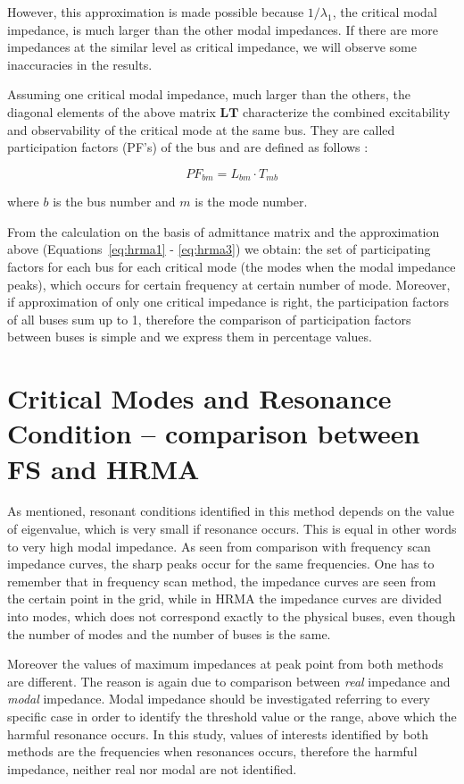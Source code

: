 \documentclass[12pt]{report} %
\begin{document}
However, this approximation is made possible because $1/\lambda_1$, the critical modal impedance, is much larger than the other modal impedances. If there are more impedances at the similar level as critical impedance, we will observe some inaccuracies in the results.

Assuming one critical modal impedance, much larger than the others, the diagonal elements of the above matrix $\bm{LT}$ characterize the combined excitability and observability of the critical mode at the same bus. They are called participation factors (PF's) of the bus and are defined as follows \cite{xu2005}:

\begin{equation} \label{eq:hrma3}
	PF_{bm}=L_{bm}\cdot T_{mb}
\end{equation}

where $b$ is the bus number and $m$ is the mode number.

From the calculation on the basis of admittance matrix and the  approximation above (Equations~\ref{eq:hrma1} - \ref{eq:hrma3}) we obtain: the set of participating factors for each bus for each critical mode (the modes when the modal impedance peaks), which occurs for certain frequency at certain number of mode. Moreover, if approximation of only one critical impedance is right, the participation factors of all buses sum up to 1, therefore the comparison of participation factors between buses is simple and we express them in percentage values.

\section{Critical Modes and Resonance Condition – comparison between FS and HRMA}
As mentioned, resonant conditions identified in this method depends on the value of eigenvalue, which is very small if resonance occurs. This is equal in other words to very high modal impedance. As seen from comparison with frequency scan impedance curves, the sharp peaks occur for the same frequencies. One has to remember that in frequency scan method, the impedance curves are seen from the certain point in the grid, while in HRMA the impedance curves are divided into modes, which does not correspond exactly to the physical buses, even though the number of modes and the number of buses is the same.

Moreover the values of maximum impedances at peak point from both methods are different. The reason is again due to comparison between \textit{real} impedance and \textit{modal} impedance. Modal impedance should be investigated referring to every specific case in order to identify the threshold value or the range, above which the harmful resonance occurs. In this study, values of interests identified by both methods are the frequencies when resonances occurs, therefore the harmful impedance, neither real nor modal are not identified.
\end{document}
